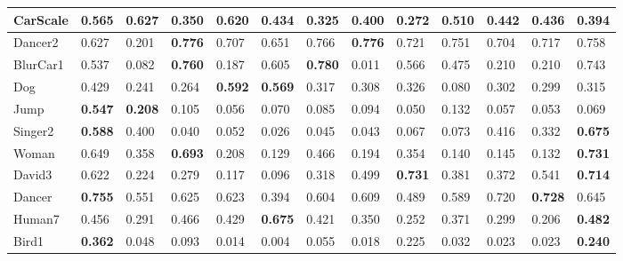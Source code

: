 \documentclass{article}
\begin{document}
\begin{table}[t]
\begin{tabular}{|l|l|l|l|l|l|l|l|l|l|l|l|l|}
		CarScale & {\color[HTML]{FE0000} \textbf{0.565}} & {\color[HTML]{32CB00} \textbf{0.627}} & 0.350 & 0.620 & 0.434 & 0.325 & 0.400 & 0.272 & 0.510 & 0.442 & 0.436 & 0.394 \\ \hline
		Dancer2 & 0.627 & 0.201 & {\color[HTML]{32CB00} \textbf{0.776}} & 0.707 & 0.651 & 0.766 & {\color[HTML]{FE0000} \textbf{0.776}} & 0.721 & 0.751 & 0.704 & 0.717 & 0.758 \\ \hline
		BlurCar1 & 0.537 & 0.082 & {\color[HTML]{FE0000} \textbf{0.760}} & 0.187 & 0.605 & {\color[HTML]{32CB00} \textbf{0.780}} & 0.011 & 0.566 & 0.475 & 0.210 & 0.210 & 0.743 \\ \hline
		Dog & {\color[HTML]{333333} 0.429} & 0.241 & 0.264 & {\color[HTML]{32CB00} \textbf{0.592}} & {\color[HTML]{FE0000} \textbf{0.569}} & 0.317 & 0.308 & 0.326 & 0.080 & 0.302 & 0.299 & 0.315 \\ \hline
		Jump & {\color[HTML]{32CB00} \textbf{0.547}} & {\color[HTML]{FE0000} \textbf{0.208}} & 0.105 & 0.056 & 0.070 & 0.085 & 0.094 & 0.050 & 0.132 & 0.057 & 0.053 & 0.069 \\ \hline
		Singer2 & {\color[HTML]{FE0000} \textbf{0.588}} & {\color[HTML]{333333} 0.400} & 0.040 & 0.052 & 0.026 & 0.045 & 0.043 & 0.067 & 0.073 & 0.416 & 0.332 & {\color[HTML]{32CB00} \textbf{0.675}} \\ \hline
		Woman & {\color[HTML]{333333} 0.649} & 0.358 & {\color[HTML]{FE0000} \textbf{0.693}} & 0.208 & 0.129 & 0.466 & 0.194 & 0.354 & 0.140 & 0.145 & 0.132 & {\color[HTML]{32CB00} \textbf{0.731}} \\ \hline
		David3 & {\color[HTML]{333333} 0.622} & 0.224 & 0.279 & 0.117 & 0.096 & 0.318 & {\color[HTML]{333333} 0.499} & {\color[HTML]{32CB00} \textbf{0.731}} & 0.381 & 0.372 & 0.541 & {\color[HTML]{FE0000} \textbf{0.714}} \\ \hline
		Dancer & {\color[HTML]{32CB00} \textbf{0.755}} & 0.551 & 0.625 & 0.623 & 0.394 & 0.604 & 0.609 & 0.489 & 0.589 & {\color[HTML]{333333} 0.720} & {\color[HTML]{FE0000} \textbf{0.728}} & 0.645 \\ \hline
		Human7 & {\color[HTML]{333333} 0.456} & {\color[HTML]{333333} 0.291} & {\color[HTML]{333333} 0.466} & 0.429 & {\color[HTML]{32CB00} \textbf{0.675}} & 0.421 & 0.350 & 0.252 & 0.371 & 0.299 & 0.206 & {\color[HTML]{FE0000} \textbf{0.482}} \\ \hline
		Bird1 & {\color[HTML]{32CB00} \textbf{0.362}} & 0.048 & 0.093 & 0.014 & 0.004 & 0.055 & 0.018 & {\color[HTML]{333333} 0.225} & 0.032 & 0.023 & 0.023 & {\color[HTML]{FE0000} \textbf{0.240}} \\ \hline

\end{tabular}
\end{table}
\end{document}
